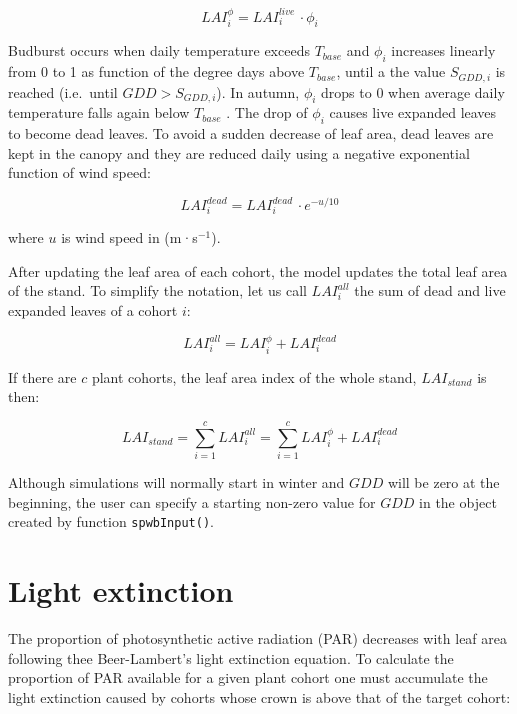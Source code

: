 \documentclass[]{book}
\begin{document}
\begin{equation}
LAI_{i}^{\phi}=LAI^{live}_i\,\cdot\phi_i
\end{equation}

Budburst occurs when daily temperature exceeds \(T_{base}\) and
\(\phi_i\) increases linearly from 0 to 1 as function of the degree days
above \(T_{base}\), until a the value \(S_{GDD,i}\) is reached
(i.e.~until \(GDD > S_{GDD,i}\)). In autumn, \(\phi_i\) drops to 0 when
average daily temperature falls again below \(T_{base}\)
\citep{Sitch2003}. The drop of \(\phi_i\) causes live expanded leaves to
become dead leaves. To avoid a sudden decrease of leaf area, dead leaves
are kept in the canopy and they are reduced daily using a negative
exponential function of wind speed:

\begin{equation}
LAI^{dead}_i=LAI^{dead}_i\,\cdot e^{- u/10}
\end{equation}

where \(u\) is wind speed in (m·s\(^{-1}\)).

After updating the leaf area of each cohort, the model updates the total
leaf area of the stand. To simplify the notation, let us call
\(LAI^{all}_{i}\) the sum of dead and live expanded leaves of a cohort
\(i\):

\begin{equation}
LAI^{all}_{i} = LAI^{\phi}_{i}+LAI^{dead}_{i}
\end{equation}

If there are \(c\) plant cohorts, the leaf area index of the whole
stand, \(LAI_{stand}\) is then:

\begin{equation}
LAI_{stand} = \sum_{i=1}^c{LAI_{i}^{all}}= \sum_{i=1}^c{LAI^{\phi}_{i}+LAI^{dead}_{i}}
\end{equation}

Although simulations will normally start in winter and \(GDD\) will be
zero at the beginning, the user can specify a starting non-zero value
for \(GDD\) in the object created by function \texttt{spwbInput()}.

\section{Light extinction}\label{light-extinction}

The proportion of photosynthetic active radiation (PAR) decreases with
leaf area following thee Beer-Lambert's light extinction equation. To
calculate the proportion of PAR available for a given plant cohort one
must accumulate the light extinction caused by cohorts whose crown is
above that of the target cohort:
\end{document}

